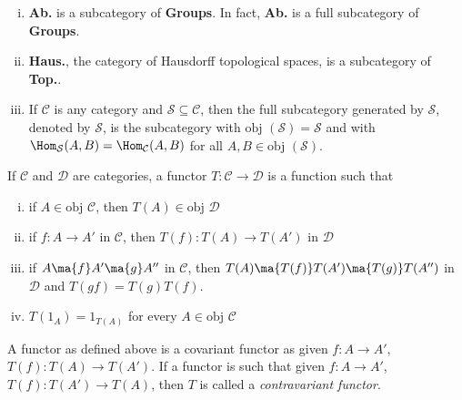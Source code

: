 \begin{ex} \hfill
	\begin{enumerate}[(i)]
	\item \textbf{Ab.} is a subcategory of \textbf{Groups}. In fact, \textbf{Ab.} is a full subcategory of \textbf{Groups}. 
	\item \textbf{Haus.}, the category of Hausdorff topological spaces, is a subcategory of \textbf{Top.}. 
	\item If $\mathcal{C}$ is any category and $\mathcal{S} \subseteq \mathcal{C}$, then the full subcategory generated by $\mathcal{S}$, denoted by $\mathcal{S}$, is the subcategory with $\text{obj }(\mathcal{S})=\mathcal{S}$ and with $\Hom_\mathcal{S}(A,B)=\Hom_\mathcal{C}(A,B)$ for all $A,B \in \text{obj }(\mathcal{S})$. 
	\end{enumerate} \xqed
\end{ex}


\begin{dfn}[Functor]
If $\mathcal{C}$ and $\mathcal{D}$ are categories, a functor $T: \mathcal{C} \to \mathcal{D}$ is a function such that
	\begin{enumerate}[(i)]
	\item if $A \in \text{obj }\mathcal{C}$, then $T(A) \in \text{obj }\mathcal{D}$
	\item if $f: A \to A'$ in $\mathcal{C}$, then $T(f): T(A) \to T(A')$ in $\mathcal{D}$
	\item if $A \ma{f} A' \ma{g} A''$ in $\mathcal{C}$, then $T(A) \ma{T(f)} T(A') \ma{T(g)} T(A'')$ in $\mathcal{D}$ and $T(gf)=T(g)T(f)$.
	\item $T(1_A)=1_{T(A)}$ for every $A \in \text{obj }\mathcal{C}$
	\end{enumerate}
\end{dfn}


\begin{rem}
A functor as defined above is a covariant functor as given $f: A \to A'$, $T(f): T(A) \to T(A')$. If a functor is such that given $f: A \to A'$, $T(f): T(A') \to T(A)$, then $T$ is called a \emph{contravariant functor}. 
\end{rem}


